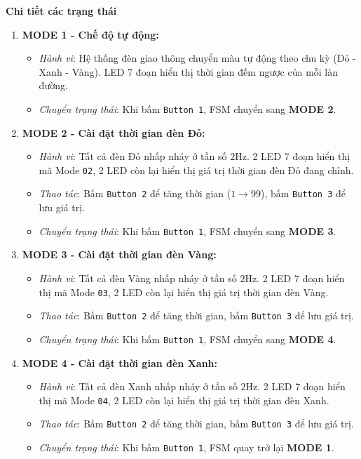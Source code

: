 \textbf{Chi tiết các trạng thái}
\begin{enumerate}
    \item \textbf{MODE 1 - Chế độ tự động:}
    \begin{itemize}
        \item \textit{Hành vi}: Hệ thống đèn giao thông chuyển màu tự động theo chu kỳ (Đỏ - Xanh - Vàng). LED 7 đoạn hiển thị thời gian đếm ngược của mỗi làn đường.
        \item \textit{Chuyển trạng thái}: Khi bấm \texttt{Button 1}, FSM chuyển sang \textbf{MODE 2}.
    \end{itemize}
    
    \item \textbf{MODE 2 - Cài đặt thời gian đèn Đỏ:}
    \begin{itemize}
        \item \textit{Hành vi}: Tất cả đèn Đỏ nhấp nháy ở tần số $2\text{Hz}$. 2 LED 7 đoạn hiển thị mã Mode \texttt{02}, 2 LED còn lại hiển thị giá trị thời gian đèn Đỏ đang chỉnh.
        \item \textit{Thao tác}: Bấm \texttt{Button 2} để tăng thời gian ($1 \rightarrow 99$), bấm \texttt{Button 3} để lưu giá trị.
        \item \textit{Chuyển trạng thái}: Khi bấm \texttt{Button 1}, FSM chuyển sang \textbf{MODE 3}.
    \end{itemize}

    \item \textbf{MODE 3 - Cài đặt thời gian đèn Vàng:}
    \begin{itemize}
        \item \textit{Hành vi}: Tất cả đèn Vàng nhấp nháy ở tần số $2\text{Hz}$. 2 LED 7 đoạn hiển thị mã Mode \texttt{03}, 2 LED còn lại hiển thị giá trị thời gian đèn Vàng.
        \item \textit{Thao tác}: Bấm \texttt{Button 2} để tăng thời gian, bấm \texttt{Button 3} để lưu giá trị.
        \item \textit{Chuyển trạng thái}: Khi bấm \texttt{Button 1}, FSM chuyển sang \textbf{MODE 4}.
    \end{itemize}

    \item \textbf{MODE 4 - Cài đặt thời gian đèn Xanh:}
    \begin{itemize}
        \item \textit{Hành vi}: Tất cả đèn Xanh nhấp nháy ở tần số $2\text{Hz}$. 2 LED 7 đoạn hiển thị mã Mode \texttt{04}, 2 LED còn lại hiển thị giá trị thời gian đèn Xanh.
        \item \textit{Thao tác}: Bấm \texttt{Button 2} để tăng thời gian, bấm \texttt{Button 3} để lưu giá trị.
        \item \textit{Chuyển trạng thái}: Khi bấm \texttt{Button 1}, FSM quay trở lại \textbf{MODE 1}.
    \end{itemize}
\end{enumerate}

